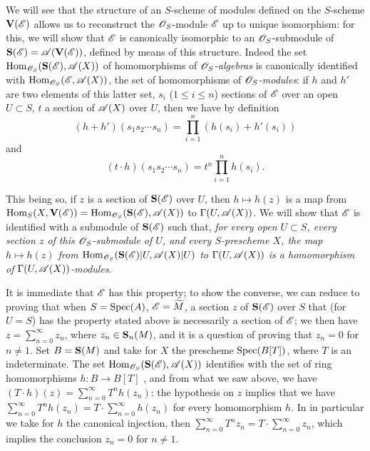 \begin{env}[1.7.14]
\label{II.1.7.14}
We will see that the structure of an $S$-scheme of modules defined on the $S$-scheme $\mathbf{V}(\mathscr{E})$ allows us to reconstruct the $\mathscr{O}_S$-module $\mathscr{E}$ up to unique isomorphism: for this, we will show that $\mathscr{E}$ is canonically isomorphic to an $\mathscr{O}_S$-submodule of $\mathbf{S}(\mathscr{E})=\mathscr{A}(\mathbf{V}(\mathscr{E}))$, defined by means of this structure.
Indeed  the set $\operatorname{Hom}_{\mathscr{O}_S}(\mathbf{S}(\mathscr{E}),\mathscr{A}(X))$ of homomorphisms of \emph{$\mathscr{O}_S$-algebras} is canonically identified with $\operatorname{Hom}_{\mathscr{O}_S}(\mathscr{E},\mathscr{A}(X))$, the set of homomorphisms of \emph{$\mathscr{O}_S$-modules}: if $h$ and $h'$ are two elements of this latter set, $s_i$ ($1\leq i\leq n$) sections of $\mathscr{E}$ over an open $U\subset S$, $t$ a section of $\mathscr{A}(X)$ over $U$, then we have by definition
\[
  (h+h')(s_1 s_2\cdots s_n)=\prod_{i=1}^n(h(s_i)+h'(s_i))
\]
and
\[
  (t\cdot h)(s_1 s_2\cdots s_n)=t^n\prod_{i=1}^n h(s_i).
\]

This being so, if $z$ is a section of $\mathbf{S}(\mathscr{E})$ over $U$, then $h\mapsto h(z)$ is a map from $\operatorname{Hom}_S(X,\mathbf{V}(\mathscr{E}))=\operatorname{Hom}_{\mathscr{O}_S}(\mathbf{S}(\mathscr{E}),\mathscr{A}(X))$ to $\Gamma(U,\mathscr{A}(X))$.
We will
show that $\mathscr{E}$ is identified with a submodule of $\mathbf{S}(\mathscr{E})$ such that, \emph{for every open $U\subset S$, every section $z$ of this $\mathscr{O}_S$-submodule of $U$, and every $S$-prescheme $X$, the map $h\mapsto h(z)$ from $\operatorname{Hom}_{\mathscr{O}_S}(\mathbf{S}(\mathscr{E})|U,\mathscr{A}(X)|U)$ to $\Gamma(U,\mathscr{A}(X))$ is a homomorphism of $\Gamma(U,\mathscr{A}(X))$-modules}.

It is immediate that $\mathscr{E}$ has this property; to show the converse, we can reduce to proving that when $S=\operatorname{Spec}(A)$, $\mathscr{E}=\widetilde{M}$, a section $z$ of $\mathbf{S}(\mathscr{E})$ over $S$ that (for $U=S$) has the property stated above is necessarily a section of $\mathscr{E}$; we then have $z=\sum_{n=0}^\infty z_n$, where $z_n\in\mathbf{S}_n(M)$, and it is a question of proving that $z_n=0$ for $n\neq 1$.
Set $B=\mathbf{S}(M)$ and take for $X$ the prescheme $\operatorname{Spec}(B[T])$, where $T$ is an indeterminate.
The set $\operatorname{Hom}_{\mathscr{O}_S}(\mathbf{S}(\mathscr{E}),\mathscr{A}(X))$ identifies with the set of ring homomorphisms $h:B\to B[T]$ , and from what we saw above, we have $(T\cdot h)(z)=\sum_{n=0}^\infty T^n h(z_n)$: the hypothesis on $z$ implies that we have $\sum_{n=0}^\infty T^n h(z_n)=T\cdot\sum_{n=0}^\infty h(z_n)$ for every homomorphism $h$.
In in particular we take for $h$ the canonical injection, then $\sum_{n=0}^\infty T^n z_n=T\cdot\sum_{n=0}^\infty z_n$, which implies the conclusion $z_n=0$ for $n\neq 1$.
\end{env}

